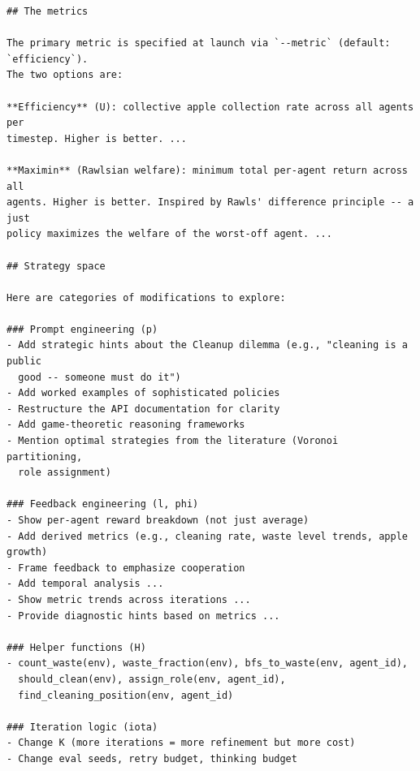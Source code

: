 \documentclass{article}
\newcommand{\cR}{\mathcal{R}}
\begin{document}
\begin{lstlisting}[style=prompttext, caption={Excerpt from $p_\cR$. The remaining parts of $p_\cR$ describe the file layout of the inner-loop pipeline, the evaluation script invocation, the keep/discard rule, and the logging format; none of those add task-specific strategic guidance.}, label={lst:r-prompt}]
## The metrics

The primary metric is specified at launch via `--metric` (default: `efficiency`).
The two options are:

**Efficiency** (U): collective apple collection rate across all agents per
timestep. Higher is better. ...

**Maximin** (Rawlsian welfare): minimum total per-agent return across all
agents. Higher is better. Inspired by Rawls' difference principle -- a just
policy maximizes the welfare of the worst-off agent. ...

## Strategy space

Here are categories of modifications to explore:

### Prompt engineering (p)
- Add strategic hints about the Cleanup dilemma (e.g., "cleaning is a public
  good -- someone must do it")
- Add worked examples of sophisticated policies
- Restructure the API documentation for clarity
- Add game-theoretic reasoning frameworks
- Mention optimal strategies from the literature (Voronoi partitioning,
  role assignment)

### Feedback engineering (l, phi)
- Show per-agent reward breakdown (not just average)
- Add derived metrics (e.g., cleaning rate, waste level trends, apple growth)
- Frame feedback to emphasize cooperation
- Add temporal analysis ...
- Show metric trends across iterations ...
- Provide diagnostic hints based on metrics ...

### Helper functions (H)
- count_waste(env), waste_fraction(env), bfs_to_waste(env, agent_id),
  should_clean(env), assign_role(env, agent_id),
  find_cleaning_position(env, agent_id)

### Iteration logic (iota)
- Change K (more iterations = more refinement but more cost)
- Change eval seeds, retry budget, thinking budget
\end{lstlisting}
\end{document}
